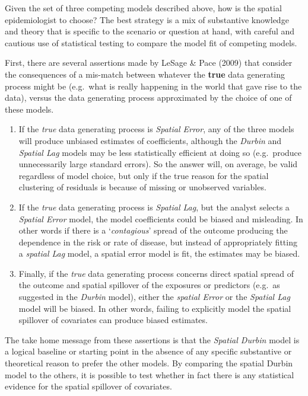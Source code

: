 \documentclass[
]{book}
\providecommand{\tightlist}{%
  \setlength{\itemsep}{0pt}\setlength{\parskip}{0pt}}
\begin{document}
Given the set of three competing models described above, how is the spatial epidemiologist to choose? The best strategy is a mix of substantive knowledge and theory that is specific to the scenario or question at hand, with careful and cautious use of statistical testing to compare the model fit of competing models.

First, there are several assertions made by LeSage \& Pace (2009) that consider the consequences of a mis-match between whatever the \textbf{true} data generating process might be (e.g.~what is really happening in the world that gave rise to the data), versus the data generating process approximated by the choice of one of these models.

\begin{enumerate}
\def\labelenumi{\arabic{enumi}.}
\tightlist
\item
  If the \emph{true} data generating process is \emph{Spatial Error}, any of the three models will produce unbiased estimates of coefficients, although the \emph{Durbin} and \emph{Spatial Lag} models may be less statistically efficient at doing so (e.g.~produce unnecessarily large standard errors). So the answer will, on average, be valid regardless of model choice, but only if the true reason for the spatial clustering of residuals is because of missing or unobserved variables.
\item
  If the \emph{true} data generating process is \emph{Spatial Lag}, but the analyst selects a \emph{Spatial Error} model, the model coefficients could be biased and misleading. In other words if there is a `\emph{contagious}' spread of the outcome producing the dependence in the risk or rate of disease, but instead of appropriately fitting a \emph{spatial Lag} model, a spatial error model is fit, the estimates may be biased.
\item
  Finally, if the \emph{true} data generating process concerns direct spatial spread of the outcome and spatial spillover of the exposures or predictors (e.g.~as suggested in the \emph{Durbin} model), either the \emph{spatial Error} or the \emph{Spatial Lag} model will be biased. In other words, failing to explicitly model the spatial spillover of covariates can produce biased estimates.
\end{enumerate}

The take home message from these assertions is that the \emph{Spatial Durbin} model is a logical baseline or starting point in the absence of any specific substantive or theoretical reason to prefer the other models. By comparing the spatial Durbin model to the others, it is possible to test whether in fact there is any statistical evidence for the spatial spillover of covariates.
\end{document}
